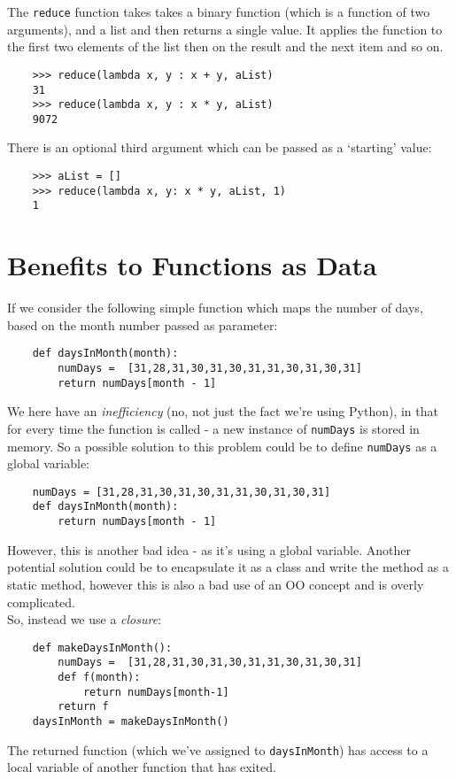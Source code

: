 The \verb|reduce| function takes takes a binary function (which is a function of two arguments), and a list and then returns a single value. It applies the function to the first two elements of the list then on the result and the next item and so on. 
\begin{verbatim}
    >>> reduce(lambda x, y : x + y, aList)
    31
    >>> reduce(lambda x, y : x * y, aList)
    9072
\end{verbatim}

There is an optional third argument which can be passed as a `starting' value:
\begin{verbatim}
    >>> aList = []
    >>> reduce(lambda x, y: x * y, aList, 1)
    1
\end{verbatim}

\section{Benefits to Functions as Data}
If we consider the following simple function which maps the number of days, based on the month number passed as parameter:
\begin{verbatim}
    def daysInMonth(month):
        numDays =  [31,28,31,30,31,30,31,31,30,31,30,31]
        return numDays[month - 1]
\end{verbatim}

We here have an \textit{inefficiency} (no, not just the fact we're using Python), in that for every time the function is called - a new instance of \verb|numDays| is stored in memory. So a possible solution to this problem could be to define \verb|numDays| as a global variable:
\begin{verbatim}
    numDays = [31,28,31,30,31,30,31,31,30,31,30,31]
    def daysInMonth(month):
        return numDays[month - 1]
\end{verbatim}
However, this is another bad idea - as it's using a global variable. Another potential solution could be to encapsulate it as a class and write the method as a static method, however this is also a bad use of an OO concept and is overly complicated.\\

So, instead we use a \textit{closure}:
\begin{verbatim}
    def makeDaysInMonth():
        numDays =  [31,28,31,30,31,30,31,31,30,31,30,31]
        def f(month):
            return numDays[month-1]
        return f
    daysInMonth = makeDaysInMonth()
\end{verbatim}
The returned function (which we've assigned to \verb|daysInMonth|) has access to a local variable of another function that has exited. 

